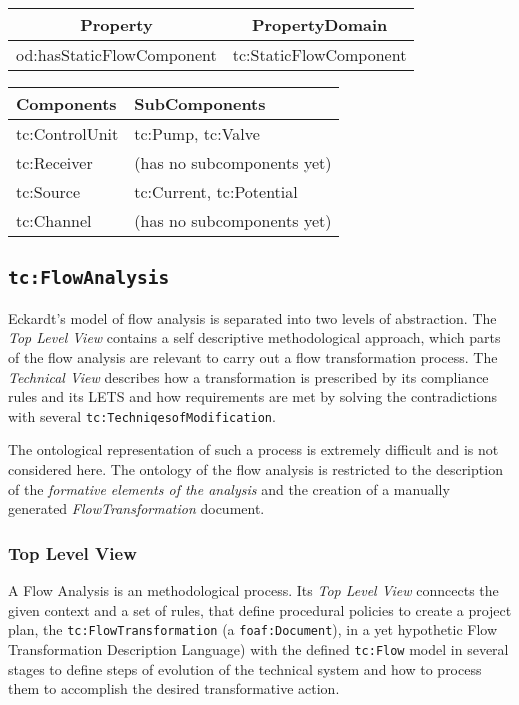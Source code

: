 \documentclass[a4paper,11pt]{article}
\begin{document}
    \begin{center}
        \begin{tabular}{|c|c|}\hline
            Property & PropertyDomain \\\hline
            od:hasStaticFlowComponent & tc:StaticFlowComponent \\\hline 
        \end{tabular}
        \end{center}
    
        \begin{center}
        \begin{tabular}{|l|p{10cm}|}\hline
            Components & SubComponents \\\hline
            tc:ControlUnit & tc:Pump, tc:Valve \\
            tc:Receiver & (has no subcomponents yet) \\
            tc:Source & tc:Current, tc:Potential \\
            tc:Channel & (has no subcomponents yet)\\\hline 
        \end{tabular}
        \end{center}
    

    \subsection{\texttt{tc:FlowAnalysis}}
    Eckardt's model of flow analysis is separated into two levels of abstraction.
    The \emph{Top Level View} contains a self descriptive methodological approach,
    which parts of the flow analysis are relevant to carry out a flow transformation
    process. The \emph{Technical View} describes how a transformation is prescribed
    by its compliance rules and its LETS and how requirements are met by 
    solving the contradictions with several \texttt{tc:TechniqesofModification}. 

    The ontological representation of such a process is extremely difficult and is
    not considered here. The ontology of the flow analysis is restricted to the
    description of the \emph{formative elements of the analysis} and the creation
    of a manually generated \emph{FlowTransformation} document.

    \subsubsection{Top Level View}
    A Flow Analysis is an methodological process. Its \emph{Top Level View}
    conncects the given context and a set of rules, that define procedural policies
    to create a project plan, the \texttt{tc:FlowTransformation} (a 
    \texttt{foaf:Document}), in a yet hypothetic Flow Transformation Description
    Language) with the defined \texttt{tc:Flow} model in several stages to define 
    steps of evolution of the technical system and how to process them to accomplish
    the desired transformative action.
\end{document}
